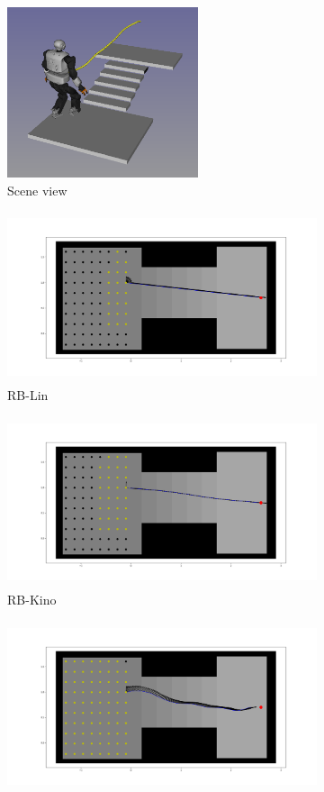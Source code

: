 \begin{figure}
    \centering
    \captionsetup[subfigure]{justification=centering}
    \begin{subfigure}[t]{0.4\linewidth}
    \includegraphics[width=\textwidth, height=5cm]{Figures/Chapter_LEAS/stairs_exemple.png}
    \caption{Scene view}
    \end{subfigure}
    \begin{subfigure}[t]{0.49\linewidth}
    \includegraphics[width=\textwidth, height=5cm]{Figures/Chapter_LEAS/stairs_lin_p1_90.png}
    \caption{RB-Lin}
    \end{subfigure}
    \begin{subfigure}[t]{0.49\linewidth}
    \includegraphics[width=\textwidth, height=5cm]{Figures/Chapter_LEAS/stairs_kino_p1_90.png}
    \caption{RB-Kino}
    \end{subfigure}
    \begin{subfigure}[t]{0.49\linewidth}
    \includegraphics[width=\textwidth, height=5cm]{Figures/Chapter_LEAS/stairs_leas_p1_90.png}

\end{subfigure}
\end{figure}
